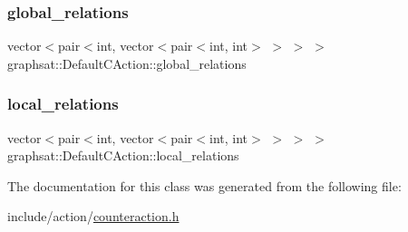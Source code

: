 \subsubsection{\texorpdfstring{global\_relations}{global\_relations}}
{\footnotesize\ttfamily vector$<$pair$<$int, vector$<$pair$<$int, int$>$ $>$ $>$ $>$ graphsat\+::\+Default\+C\+Action\+::global\+\_\+relations\hspace{0.3cm}{\ttfamily [private]}}

\mbox{\label{classgraphsat_1_1_default_c_action_afa01fc648aa9cb9713c9bb01ca5d5ce2}} 
\subsubsection{\texorpdfstring{local\_relations}{local\_relations}}
{\footnotesize\ttfamily vector$<$pair$<$int, vector$<$pair$<$int, int$>$ $>$ $>$ $>$ graphsat\+::\+Default\+C\+Action\+::local\+\_\+relations\hspace{0.3cm}{\ttfamily [private]}}



The documentation for this class was generated from the following file\+:\begin{DoxyCompactItemize}
\item 
include/action/\mbox{\hyperlink{counteraction_8h}{counteraction.\+h}}\end{DoxyCompactItemize}
